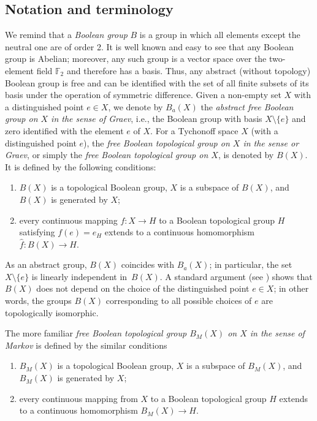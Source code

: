\documentclass[a4paper,12pt]{amsart}
\def\sm{\setminus}
\theoremstyle{definition}
\begin{document}
\subsection{Notation and terminology}
We remind that a \emph{Boolean group} $B$ is a group in which all elements 
except the neutral one are of order 2. It is well known and easy to see 
that any Boolean group is Abelian; moreover, any such group is a vector 
space over the two-element field $\mathbb F_2$ and therefore has a basis. Thus, 
any abstract (without topology) Boolean group is free and can be identified 
with the set of all finite subsets of its basis under the operation of 
symmetric difference. Given a non-empty set $X$ with a distinguished point 
$e\in X$, we denote by $B_a(X)$ the \emph{abstract free Boolean group on $X$ in 
the sense of Graev}, i.e., the Boolean group with basis $X\setminus\{e\}$ and 
zero identified with the element $e$ of $X$. For a Tychonoff space $X$ (with a 
distinguished point $e$), the \emph{free Boolean topological group on $X$ in 
the sense or Graev}, or simply the \emph{free Boolean topological group on 
$X$}, is denoted by $B(X)$. It is defined by the following conditions: 
\begin{enumerate} 
\item[(i)]  
$B(X)$ is a topological Boolean group, $X$ is a subspace of $B(X)$, and $B(X)$ 
is generated by $X$; 
\item[(ii)] 
every continuous mapping $f\colon X\to H$ to a Boolean topological group $H$ 
satisfying $f(e)=e_H$ extends to a continuous homomorphism $\widehat{f}\colon 
B(X)\to H$. 
\end{enumerate} 
As an abstract group, $B(X)$ coincides with $B_a(X)$; in particular, the set 
$X\sm\{e\}$ is linearly independent in~$B(X)$. A standard argument (see 
\cite[Section~2]{Gra}) shows that $B(X)$ does not depend on the choice of the 
distinguished point $e\in X$; in other words, the groups $B(X)$ 
corresponding to all possible choices of $e$ are topologically isomorphic. 

The more familiar \emph{free Boolean topological group $B_M(X)$ on $X$ in the 
sense of Markov} is defined by the similar conditions  
\begin{enumerate} 
\item[(i$^\prime$)] 
$B_M(X)$ is a topological Boolean group, $X$ is a subspace of $B_M(X)$, and 
$B_M(X)$ is generated by $X$;
\item[(ii$^\prime$)] 
every continuous mapping from $X$ to a 
Boolean topological group $H$ extends to a continuous homomorphism 
$B_M(X)\to H$.
\end{enumerate}
\end{document}
